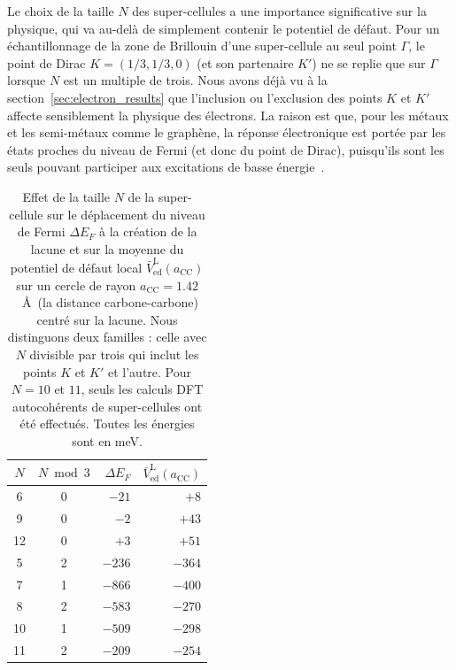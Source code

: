 Le choix de la taille $N$ des super-cellules a une importance significative sur la physique, qui va au-delà de simplement contenir le potentiel de défaut. Pour un échantillonnage de la zone de Brillouin d'une super-cellule au seul point $\Gamma$, le point de Dirac $K=(1/3, 1/3, 0)$ (et son partenaire $K'$) ne se replie que sur $\Gamma$ lorsque $N$ est un multiple de trois. Nous avons déjà vu à la section~\ref{sec:electron_results} que l'inclusion ou l'exclusion des points $K$ et $K'$ affecte sensiblement la physique des électrons. La raison est que, pour les métaux et les semi-métaux comme le graphène, la réponse électronique est portée par les états proches du niveau de Fermi (et donc du point de Dirac), puisqu'ils sont les seuls pouvant participer aux excitations de basse énergie~\cite{ashcroftSolidStatePhysics1976}.
\begin{table}[htbp]
    \centering
    \caption[Effet de l'échantillonnage au point $\Gamma$ selon la taille
    de super-cellule.]{Effet de la taille $N$ de la super-cellule sur le déplacement du niveau de Fermi $\Delta E_F$ à la création de la lacune et sur la moyenne du potentiel de défaut local $\bar V_\text{ed}^\text{L}(a_\text{CC})$ sur un cercle de rayon $a_\text{CC}=1.42$~\AA~(la distance carbone-carbone) centré sur la lacune. Nous distinguons deux familles : celle avec $N$ divisible par trois qui inclut les points $K$ et $K'$ et l'autre. Pour $N = 10$ et $11$, seuls les calculs DFT autocohérents de super-cellules ont été effectués. Toutes les énergies sont en meV.}
    \label{tab:échantillonnage}
    \begin{tabular}{c c r r}
        \hline\hline
        $N$ & $N \bmod 3$ & $\Delta E_F$ & $\bar V^\text{L}_\text{ed}(a_\text{CC})$ \\
        \hline
        6  & 0 & $-21$  & $+8$   \\
        9  & 0 & $-2$   & $+43$  \\
        12 & 0 & $+3$   & $+51$  \\
        \hline
        5  & 2 & $-236$ & $-364$ \\
        7  & 1 & $-866$ & $-400$ \\
        8  & 2 & $-583$ & $-270$ \\
        10 & 1 & $-509$ & $-298$ \\
        11 & 2 & $-209$ & $-254$ \\
        \hline\hline
    \end{tabular}
\end{table}
